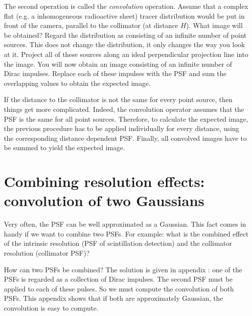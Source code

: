 The second operation is called the {\em convolution} operation. Assume that a
complex flat (e.g. a inhomogeneous radioactive sheet) tracer distribution
would be put in front of the camera, parallel to the collimator (at distance
$H$). What image will be obtained?  Regard the distribution as consisting of
an infinite number of point sources. This does not change the distribution, it
only changes the way you look at it. Project all of these sources along an
ideal perpendicular projection line into the image. You will now obtain an
image consisting of an infinite number of Dirac impulses. Replace each of
these impulses with the PSF and sum the overlapping values to obtain the
expected image.

If the distance to the collimator is not the same for every point source, then
things get more complicated. Indeed, the convolution operator assumes that the
PSF is the same for all point sources. Therefore, to calculate the expected
image, the previous procedure has to be applied individually for every
distance, using the corresponding distance dependent PSF. Finally, all
convolved images have to be summed to yield the expected image.

\newpage
\section{Combining resolution effects: convolution of
two Gaussians \label{app:convol2gauss}}
Very often, the PSF can be well approximated as a Gaussian. This fact comes in
handy if we want to combine two PSFs. For example: what is the combined effect
of the intrinsic resolution (PSF of scintillation detection) and the collimator
resolution (collimator PSF)?

How can two PSFs be combined? The solution is given in appendix
: one of the PSFs is regarded as a collection of Dirac
impulses. The second PSF must be applied to each of these pulses. So we must
compute the convolution of both PSFs. This appendix shows that if both are
approximately Gaussian, the convolution is easy to compute.

